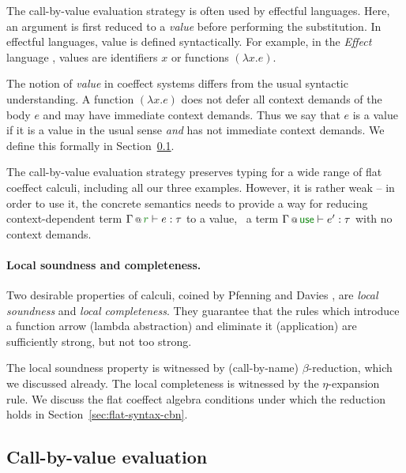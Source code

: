The call-by-value evaluation strategy is often used by effectful languages. Here, an argument is
first reduced to a \emph{value} before performing the substitution. In effectful languages,
value is defined syntactically. For example, in the \emph{Effect} language \cite{monads-effects-marriage},
values are identifiers $x$ or functions $(\lambda x.e)$.

The notion of \emph{value} in coeffect systems differs from the usual syntactic understanding.
A function $(\lambda x.e)$ does not defer all context demands of the body $e$ and may have
immediate context demands. Thus we say that $e$ is a value if it is a value in the usual
sense \emph{and} has not immediate context demands. We define this formally in
Section~\ref{sec:flat-syntax-cbv}.

The call-by-value evaluation strategy preserves typing for a wide range of flat coeffect calculi,
including all our three examples. However, it is rather weak -- in order to use it, the concrete
semantics needs to provide a way for reducing context-dependent term $\coctx{\Gamma}{\cclrd{r}} \vdash e : \tau$
to a value, \ie~a term $\coctx{\Gamma}{\cunit} \vdash e' : \tau$ with no context demands.

\paragraph{Local soundness and completeness.}
Two desirable properties of calculi, coined by Pfenning and Davies \cite{logic-modal-reconstruction},
are \emph{local soundness} and \emph{local completeness}. They guarantee that the rules which
introduce a function arrow (lambda abstraction) and eliminate it (application) are sufficiently
strong, but not too strong.

The local soundness property is witnessed by (call-by-name) $\beta$-reduction, which we discussed
already. The local completeness is witnessed by the $\eta$-expansion rule. We discuss the flat
coeffect algebra conditions under which the reduction holds in Section~\ref{sec:flat-syntax-cbn}.


\subsection{Call-by-value evaluation}
\label{sec:flat-syntax-cbv}

